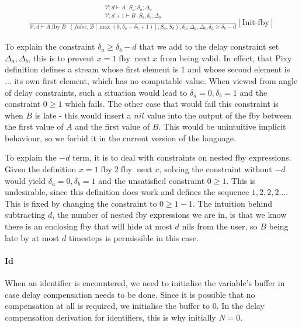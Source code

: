 \documentclass{scrartcl}
\DeclareMathOperator{\fby}{fby}
\DeclareMathOperator{\nextop}{next}
\DeclareMathOperator{\initrel}{\overset{init}{\Rightarrow}}
\begin{document}
    \begin{align*}
    \frac{
        \begin{matrix}
        \mathcal{V}; d \vdash A \initrel S_a; \delta_a; \Delta_a \\
        \mathcal{V}; d+1 \vdash B \initrel S_b; \delta_b; \Delta_b \\
        \end{matrix}
    }{
        \mathcal{V}; d \vdash A \fby B \initrel (false, \mathcal{B}[\max(0, \delta_a - \delta_b + 1)], S_a, S_b); \delta_a; \Delta_a, \Delta_b, \delta_a \geq \delta_b - d
    }[\text{Init-fby}]
    \end{align*}
    
    To explain the constraint $\delta_a \geq \delta_b - d$ that we add to the delay constraint set $\Delta_a, \Delta_b$, this is to prevent $x = 1 \fby \nextop x$ from being valid. In effect, that Pixy definition defines a stream whose first element is $1$ and whose second element is ... its own first element, which has no computable value. When viewed from angle of delay constraints, such a situation would lead to $\delta_a = 0, \delta_b = 1$ and the constraint $0 \geq 1$ which fails. The other case that would fail this constraint is when $B$ is late - this would insert a $nil$ value into the output of the fby between the first value of $A$ and the first value of $B$. This would be unintuitive implicit behaviour, so we forbid it in the current version of the language.
    
    To explain the $-d$ term, it is to deal with constraints on nested fby expressions. Given the definition $x = 1 \fby 2 \fby \nextop x$, solving the constraint without $-d$ would yield $\delta_a = 0, \delta_b = 1$ and the unsatisfied constraint $0 \geq 1$. This is undesirable, since this definition does work and defines the sequence $1, 2, 2, 2 ...$. This is fixed by changing the constraint to $0 \geq 1 - 1$. The intuition behind subtracting $d$, the number of nested fby expressions we are in, is that we know there is an enclosing fby that will hide at most $d$ nils from the user, so $B$ being late by at most $d$ timesteps is permissible in this case.
    
    \paragraph{Id}
    
    When an identifier is encountered, we need to initialise the variable's buffer in case delay compensation needs to be done. Since it is possible that no compensation at all is required, we initialise the buffer to 0. In the delay compensation derivation for identifiers, this is why initially $N=0$.
    
\end{document}
